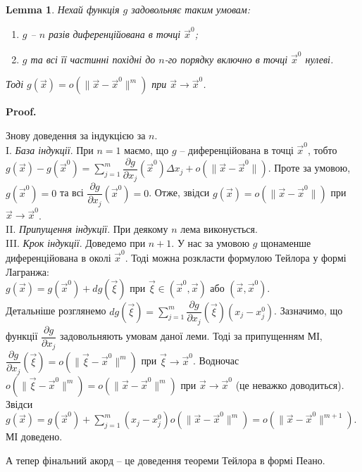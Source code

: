 \documentclass[a4paper, 10pt]{article}
\makeatletter
\def\departial#1#2{\dfrac{\partial {#1}}{\partial {#2}}}
\theoremstyle{theoremdd}
\theoremstyle{theoremdd}
\theoremstyle{theoremdd}
\theoremstyle{theoremdd}
\theoremstyle{theoremdd}
\theoremstyle{theoremdd}
\theoremstyle{theoremdd}
\theoremstyle{theoremdd}
\newtheorem{lemma}[theorem]{Lemma}
\theoremstyle{theoremdd}
\renewenvironment{proof}[1][Proof.\\]{\par
\pushQED{\hfill \qed}%
\normalfont \topsep6\p@\@plus6\p@\relax
\trivlist
\item\relax
{\bfseries
#1\@addpunct{.}}\hspace\labelsep\ignorespaces
}{%
\popQED\endtrivlist\@endpefalse
}
\makeatother
\begin{document}
\begin{lemma}
Нехай функція $g$ задовольняє таким умовам:
\begin{enumerate}[nosep,wide=0pt,label={\arabic*)}]
\item $g$ -- $n$ разів диференційована в точці $\vec{x}^0$;
\item $g$ та всі її частинні похідні до $n$-го порядку включно в точці $\vec{x}^0$ нулеві.
\end{enumerate}
Тоді $g(\vec{x}) = o(\| \vec{x} - \vec{x}^0 \|^m)$ при $\vec{x} \to \vec{x}^0$.
\end{lemma}

\begin{proof}
Знову доведення за індукцією за $n$.\\
I. \textit{База індукції}. При $n = 1$ маємо, що $g$ -- диференційована в точці $\vec{x}^0$, тобто $g(\vec{x}) - g(\vec{x}^0) = \displaystyle\sum_{j=1}^m\departial{g}{x_j}(\vec{x}^0) \Delta x_j + o(\| \vec{x} - \vec{x}^0 \|)$. Проте за умовою, $g(\vec{x}^0) = 0$ та всі $\departial{g}{x_j}(\vec{x}^0) = 0$. Отже, звідси $g(\vec{x}) = o(\| \vec{x} - \vec{x}^0 \|)$ при $\vec{x} \to \vec{x}^0$.\\
II. \textit{Припущення індукції}. При деякому $n$ лема виконується.\\
III. \textit{Крок індукції}. Доведемо при $n+1$. У нас за умовою $g$ щонаменше диференційована в околі $\vec{x}^0$. Тоді можна розкласти формулою Тейлора у формі Лагранжа:\\
$g(\vec{x}) = g(\vec{x}^0) + dg(\vec{\xi})$ при $\vec{\xi} \in (\vec{x}^0, \vec{x})$ або $(\vec{x},\vec{x}^0)$.\\
Детальніше розглянемо $dg(\vec{\xi}) = \displaystyle\sum_{j=1}^m \departial{g}{x_j}(\vec{\xi}) (x_j - x_j^0)$. Зазначимо, що функції $\departial{g}{x_j}$ задовольняють умовам даної леми. Тоді за припущенням МІ, $\departial{g}{x_j}(\vec{\xi}) = o(\| \vec{\xi} - \vec{x}^0 \|^m)$ при $\vec{\xi} \to \vec{x}^0$. Водночас $o(\| \vec{\xi} - \vec{x}^0 \|^m) = o( \| \vec{x} - \vec{x}^0 \|^m)$ при $\vec{x} \to \vec{x}^0$ (це неважко доводиться). Звідси\\
$g(\vec{x}) = g(\vec{x}^0) + \displaystyle\sum_{j=1}^m (x_j - x_j^0) o( \| \vec{x} - \vec{x}^0 \|^m) = o(\| \vec{x} - \vec{x}^0 \|^{m+1})$.\\
МІ доведено.
\end{proof}

А тепер фінальний акорд -- це доведення теореми Тейлора в формі Пеано.
\end{document}
